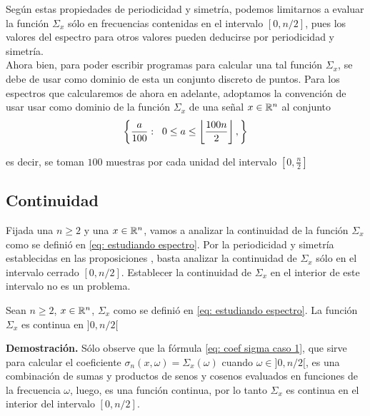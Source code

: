 \begin{nota}
\label{nota: muestreo dom frecuencia}
Según estas propiedades de periodicidad y simetría,
podemos limitarnos a evaluar la función
$\Sigma_{x}$ sólo en frecuencias
contenidas en el intervalo $[0, n/2]$, pues los valores
del espectro para otros valores pueden deducirse por periodicidad
y simetría. \\

Ahora bien, para poder escribir programas
para calcular una tal función $\Sigma_{x}$,
se debe de usar como dominio de esta
un conjunto discreto de puntos.
Para los espectros que calcularemos de ahora en 
adelante, adoptamos la convención de 
usar usar como dominio 
de la función
$\Sigma_{x}$ de una señal $x \in \mathbb{R}^{n}$
al conjunto
\begin{equation}
\label{eq: malla frecuencias}
\left\{ \frac{a}{100} : \hspace{0.2cm}
0 \leq a \leq 
\left\lfloor\frac{100n}{2}\right\rfloor,
\right\}
\end{equation}

\noindent
es decir, se toman $100$ muestras por
cada unidad del intervalo 
$\left[ 0, \frac{n}{2}\right]$
\end{nota}

\subsection{Continuidad}

Fijada una $n \geq 2$ y una $x \in \mathbb{R}^{n}$,
vamos a analizar la continuidad de la función
$\Sigma_{x}$ como se definió 
en \eqref{eq: estudiando espectro}.
Por la periodicidad y simetría establecidas
en las proposiciones 
, basta
analizar la continuidad de $\Sigma_{x}$ sólo en el
intervalo cerrado $[0, n/2]$. Establecer la continuidad
de $\Sigma_{x}$ en el interior de este intervalo no es un problema. \\

\begin{prop}
\label{prop: cont interior espectro}
Sean $n \geq 2$, $x \in \mathbb{R}^{n}$,
$\Sigma_{x}$ como se definió en \eqref{eq: estudiando espectro}.
La función $\Sigma_{x}$ es continua en 
$]0, n/2[$
\end{prop}
\noindent
\textbf{Demostración.}
Sólo observe que la fórmula
\eqref{eq: coef sigma caso 1}, que sirve
para calcular el coeficiente $\sigma_{n} (x, \omega) = \Sigma_{x}(\omega)$
cuando $\omega \in ]0, n/2[$, es una combinación
de sumas y productos de senos y cosenos
evaluados en funciones de la frecuencia $\omega$, luego, 
es una función continua, por lo tanto $\Sigma_{x}$
es continua en el interior del intervalo 
$[0, n/2]$.
\QEDB
\vspace{0.2cm}

